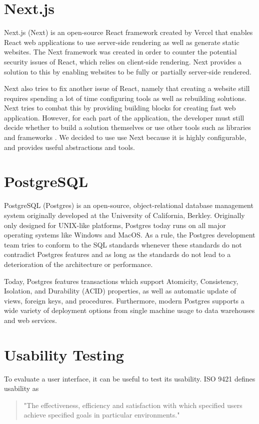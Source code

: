 \section{Next.js}
Next.js (Next) is an open-source React framework created by Vercel that enables React web applications to use server-side rendering as well as generate static websites. The Next framework was created in order to counter the potential security issues of React, which relies on client-side rendering. Next provides a solution to this by enabling websites to be fully or partially server-side rendered\cite {Nextjs_Docks}.

Next also tries to fix another issue of React, namely that creating a website still requires spending a lot of time configuring tools as well as rebuilding solutions.
Next tries to combat this by providing building blocks for creating fast web application.
However, for each part of the application, the developer must still decide whether to build a solution themselves or use other tools such as libraries and frameworks \cite{Nextjs_Docks}.
We decided to use use Next because it is highly configurable, and provides useful abstractions and tools.

\section{PostgreSQL}
PostgreSQL (Postgres) is an open-source, object-relational database management system originally developed at the University of California, Berkley. Originally only designed for UNIX-like platforms, Postgres today runs on all major operating systems like Windows and MacOS\cite{Postgres_Docs}.
As a rule, the Postgres development team tries to conform to the SQL standards whenever these standards do not contradict Postgres features and as long as the standards do not lead to a deterioration of the architecture or performance\cite{Postgres_Docs}.

Today, Postgres features transactions which support Atomicity, Consistency, Isolation, and Durability (ACID) properties, as well as automatic update of views, foreign keys, and procedures.
Furthermore, modern Postgres supports a wide variety of deployment options from single machine usage to data warehouses and web services\cite{Postgres_Docs}.

\section{Usability Testing}
To evaluate a user interface, it can be useful to test its usability. ISO 9421 defines usability as
\begin{quote}
	"The effectiveness, efficiency and satisfaction with which specified users achieve specified goals in particular environments."
\end{quote}

